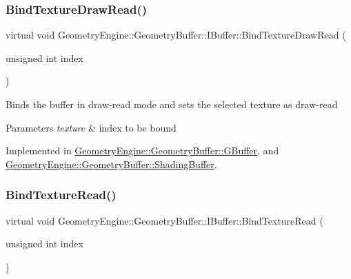 \mbox{\label{class_geometry_engine_1_1_geometry_buffer_1_1_i_buffer_a21843472d95d9c495a5df733ef2a64e3}} 
\subsubsection{\texorpdfstring{BindTextureDrawRead()}{BindTextureDrawRead()}}
{\footnotesize\ttfamily virtual void Geometry\+Engine\+::\+Geometry\+Buffer\+::\+I\+Buffer\+::\+Bind\+Texture\+Draw\+Read (\begin{DoxyParamCaption}\item[{unsigned int}]{index }\end{DoxyParamCaption})\hspace{0.3cm}{\ttfamily [pure virtual]}}

Binds the buffer in draw-\/read mode and sets the selected texture as draw-\/read 
\begin{DoxyParams}{Parameters}
{\em texture} & index to be bound \\
\hline
\end{DoxyParams}


Implemented in \mbox{\hyperlink{class_geometry_engine_1_1_geometry_buffer_1_1_g_buffer_a1df706f920cc9a2b15609c6c7e179130}{Geometry\+Engine\+::\+Geometry\+Buffer\+::\+G\+Buffer}}, and \mbox{\hyperlink{class_geometry_engine_1_1_geometry_buffer_1_1_shading_buffer_ad11150c070d2b598864a227d48919237}{Geometry\+Engine\+::\+Geometry\+Buffer\+::\+Shading\+Buffer}}.

\mbox{\label{class_geometry_engine_1_1_geometry_buffer_1_1_i_buffer_ab4c82eeb6d07ea902e0de3fad67c29f2}} 
\subsubsection{\texorpdfstring{BindTextureRead()}{BindTextureRead()}}
{\footnotesize\ttfamily virtual void Geometry\+Engine\+::\+Geometry\+Buffer\+::\+I\+Buffer\+::\+Bind\+Texture\+Read (\begin{DoxyParamCaption}\item[{unsigned int}]{index }\end{DoxyParamCaption})\hspace{0.3cm}{\ttfamily [pure virtual]}}

